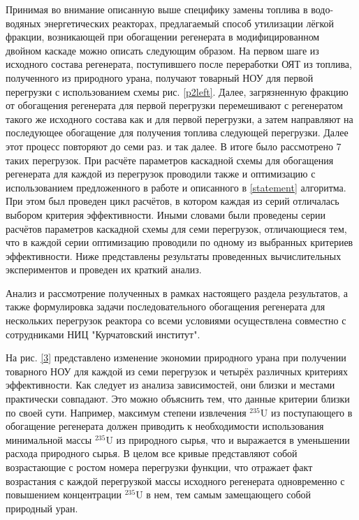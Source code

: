 Принимая во внимание описанную выше специфику замены топлива в водо-водяных энергетических реакторах, предлагаемый способ утилизации лёгкой фракции, возникающей при обогащении регенерата в модифицированном двойном каскаде можно описать следующим образом. На первом шаге из исходного состава регенерата, поступившего после переработки ОЯТ из топлива, полученного из природного урана, получают товарный НОУ для первой перегрузки с использованием схемы рис. \ref{p2left}. Далее, загрязненную фракцию от обогащения регенерата для первой перегрузки перемешивают с регенератом такого же исходного состава как и для первой перегрузки, а затем направляют на последующее обогащение для получения топлива следующей перегрузки. Далее этот процесс повторяют до семи раз. и так далее. В итоге было рассмотрено 7 таких перегрузок. При расчёте параметров каскадной схемы для обогащения регенерата для каждой из перегрузок проводили также и оптимизацию с использованием предложенного в работе и описанного в \ref{statement} алгоритма. При этом был проведен цикл расчётов, в котором каждая из серий отличалась выбором критерия эффективности. Иными словами были проведены серии расчётов параметров каскадной схемы для семи перегрузок, отличающиеся тем, что в каждой серии оптимизацию проводили по одному из выбранных критериев эффективности. Ниже представлены результаты проведенных вычислительных экспериментов и проведен их краткий анализ.

Анализ и рассмотрение полученных в рамках настоящего раздела результатов, а также формулировка задачи последовательного обогащения регенерата для нескольких перегрузок реактора со всеми условиями осуществлена совместно с сотрудниками НИЦ "Курчатовский институт".

На рис. \ref{3} представлено изменение экономии природного урана при получении товарного НОУ для каждой из семи перегрузок и четырёх различных критериях эффективности. Как следует из анализа зависимостей, они близки и местами практически совпадают. Это можно объяснить тем, что данные критерии близки по своей сути. Например, максимум степени извлечения $^{235}$U из поступающего в обогащение регенерата должен приводить к необходимости использования минимальной массы $^{235}$U из природного сырья, что и выражается в уменьшении расхода природного сырья. В целом все кривые представляют собой возрастающие с ростом номера перегрузки функции, что отражает факт возрастания с каждой перегрузкой массы исходного регенерата одновременно с повышением концентрации $^{235}$U в нем, тем самым замещающего собой природный уран.

